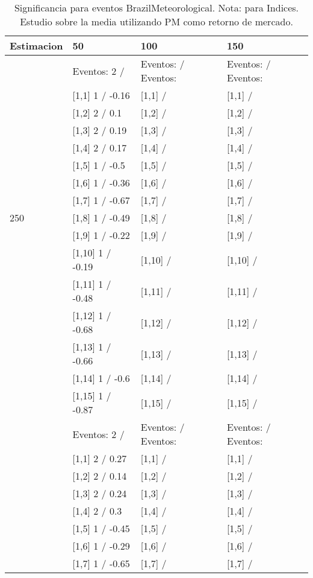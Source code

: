 \begin{table}

\caption{Significancia para eventos BrazilMeteorological. Nota: para Indices. Estudio sobre la media utilizando PM como retorno de mercado.}
\centering
\begin{tabular}[t]{llll}
\toprule
Estimacion & 50 & 100 & 150\\
\midrule
 & Eventos:  2 / & Eventos:   / Eventos: & Eventos:   / Eventos:\\
 & {}[1,1] 1  / -0.16 & {}[1,1]  / & {}[1,1]  /\\
 & {}[1,2] 2  / 0.1 & {}[1,2]  / & {}[1,2]  /\\
 & {}[1,3] 2  / 0.19 & {}[1,3]  / & {}[1,3]  /\\
 & {}[1,4] 2  / 0.17 & {}[1,4]  / & {}[1,4]  /\\
\addlinespace
 & {}[1,5] 1  / -0.5 & {}[1,5]  / & {}[1,5]  /\\
 & {}[1,6] 1  / -0.36 & {}[1,6]  / & {}[1,6]  /\\
 & {}[1,7] 1  / -0.67 & {}[1,7]  / & {}[1,7]  /\\
250 & {}[1,8] 1  / -0.49 & {}[1,8]  / & {}[1,8]  /\\
 & {}[1,9] 1  / -0.22 & {}[1,9]  / & {}[1,9]  /\\
\addlinespace
 & {}[1,10] 1  / -0.19 & {}[1,10]  / & {}[1,10]  /\\
 & {}[1,11] 1  / -0.48 & {}[1,11]  / & {}[1,11]  /\\
 & {}[1,12] 1  / -0.68 & {}[1,12]  / & {}[1,12]  /\\
 & {}[1,13] 1  / -0.66 & {}[1,13]  / & {}[1,13]  /\\
 & {}[1,14] 1  / -0.6 & {}[1,14]  / & {}[1,14]  /\\
\addlinespace
 & {}[1,15] 1  / -0.87 & {}[1,15]  / & {}[1,15]  /\\
 & Eventos:  2 / & Eventos:   / Eventos: & Eventos:   / Eventos:\\
 & {}[1,1] 2  / 0.27 & {}[1,1]  / & {}[1,1]  /\\
 & {}[1,2] 2  / 0.14 & {}[1,2]  / & {}[1,2]  /\\
 & {}[1,3] 2  / 0.24 & {}[1,3]  / & {}[1,3]  /\\
\addlinespace
 & {}[1,4] 2  / 0.3 & {}[1,4]  / & {}[1,4]  /\\
 & {}[1,5] 1  / -0.45 & {}[1,5]  / & {}[1,5]  /\\
 & {}[1,6] 1  / -0.29 & {}[1,6]  / & {}[1,6]  /\\
 & {}[1,7] 1  / -0.65 & {}[1,7]  / & {}[1,7]  /\\

\end{tabular}
\end{table}
